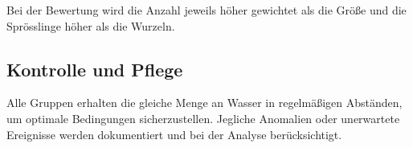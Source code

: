     Bei der Bewertung wird die Anzahl jeweils höher gewichtet als die Größe und die Sprösslinge höher als die Wurzeln.
    
    \subsection{Kontrolle und Pflege}
    Alle Gruppen erhalten die gleiche Menge an Wasser in regelmäßigen Abständen, um optimale Bedingungen sicherzustellen. Jegliche Anomalien oder unerwartete Ereignisse werden dokumentiert und bei der Analyse berücksichtigt.